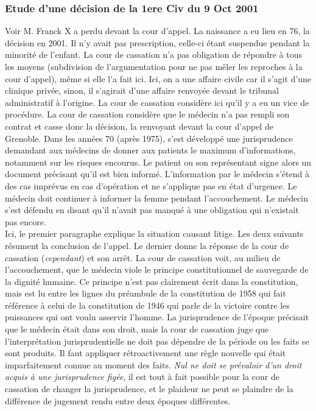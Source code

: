 \documentclass[math]{cours}
\begin{document}
\subsubsection{Etude d'une décision de la 1ere Civ du 9 Oct 2001}
	Voir \cite{CassCiv19102001}
	M. Franck X a perdu devant la cour d'appel.
	La naissance a eu lieu en 76, la décision en 2001. Il n'y avait pas prescription, celle-ci étant suspendue pendant la minorité de l'enfant.
	La cour de cassation n'a pas obligation de répondre à tous les moyens (subdivision de l'argumentation pour ne pas mêler les reproches à la cour d'appel), même si elle l'a fait ici.
	Ici, on a une affaire civile car il s'agit d'une clinique privée, sinon, il s'agirait d'une affaire renvoyée devant le tribunal administratif à l'origine.
	La cour de cassation considère ici qu'il y a eu un vice de procédure.
	La cour de cassation considère que le médecin n'a pas rempli son contrat et casse donc la décision, la renvoyant devant la cour d'appel de Grenoble.
	Dans les années 70 (après 1975), s'est développé une jurisprudence demandant aux médecins de donner aux patients le maximum d'informations, notamment sur les risques encourus.
	Le patient ou son représentant signe alors un document précisant qu'il est bien informé.
	L'information par le médecin s'étend à des cas imprévus en cas d'opération et ne s'applique pas en état d'urgence.
	Le médecin doit continuer à informer la femme pendant l'accouchement.
	Le médecin s'est défendu en disant qu'il n'avait pas manqué à une obligation qui n'existait pas encore.\\

	Ici, le premier paragraphe explique la situation causant litige.
	Les deux suivants résument la conclusion de l'appel.
	Le dernier donne la réponse de la cour de cassation (\textit{cependant}) et son arrêt.
	La cour de cassation voit, au milieu de l'accouchement, que le médecin viole le principe constitutionnel de sauvegarde de la dignité humaine.
	Ce principe n'est pas clairement écrit dans la constitution, mais est lu entre les lignes du préambule de la constitution de 1958 qui fait référence à celui de la constitution de 1946 qui parle de la victoire contre les puissances qui ont voulu asservir l'homme.
	La jurisprudence de l'époque précisait que le médecin était dans son droit, mais la cour de cassation juge que l'interprétation jurisprudentielle ne doit pas dépendre de la période ou les faits se sont produits.
	Il faut appliquer rétroactivement une règle nouvelle qui était imparfaitement connue au moment des faits.
	\textit{Nul ne doit se prévaloir d'un droit acquis à une jurisprudence figée}, il est tout à fait possible pour la cour de cassation de changer la jurisprudence,
	et le plaideur ne peut se plaindre de la différence de jugement rendu entre deux époques différentes.
\end{document}

